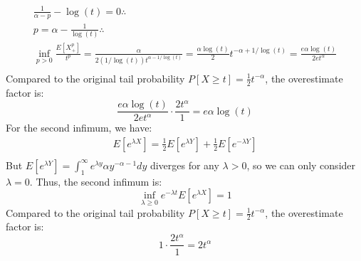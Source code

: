 \documentclass[11pt,a4paper,margin=1in]{article}
\begin{document}
\begin{enumerate}[(a)]
\begin{gather*}
        \frac{1}{\alpha - p} - \log(t) = 0 \therefore \\
        p = \alpha - \frac{1}{\log(t)} \therefore \\
        \inf_{p > 0}\frac{E[X_+^p]}{t^p} = \frac{\alpha}{2(1/\log(t))t^{\alpha - 1/\log(t)}} = \frac{\alpha \log(t)}{2} t^{-\alpha + 1/\log(t)} = \frac{e\alpha\log(t)}{2et^{\alpha}}\\
    \end{gather*}
    Compared to the original tail probability $P[X \geq t] = \frac{1}{2} t^{-\alpha}$,
    the overestimate factor is:
    \[
        \frac{e\alpha\log(t)}{2et^{\alpha}} \cdot \frac{2t^{\alpha}}{1} = e\alpha\log(t)
    \]
    For the second infimum, we have:
    \begin{gather*}
        E[e^{\lambda X}] = \frac{1}{2} E[e^{\lambda Y}] + \frac{1}{2} E[e^{-\lambda Y}] \\
    \end{gather*}
    But $E[e^{\lambda Y}] = \int_1^\infty e^{\lambda y} \alpha y^{-\alpha - 1} dy$ 
    diverges for any $\lambda > 0$, so we can only consider $\lambda = 0$. Thus, the second infimum is:
    \[
        \inf_{\lambda \geq 0} e^{-\lambda t} E[e^{\lambda X}] = 1
    \]
    Compared to the original tail probability $P[X \geq t] = \frac{1}{2} t^{-\alpha}$,
    the overestimate factor is:
    \[
        1 \cdot \frac{2t^{\alpha}}{1} = 2t^{\alpha}
    \]
\end{enumerate}
\end{document}
